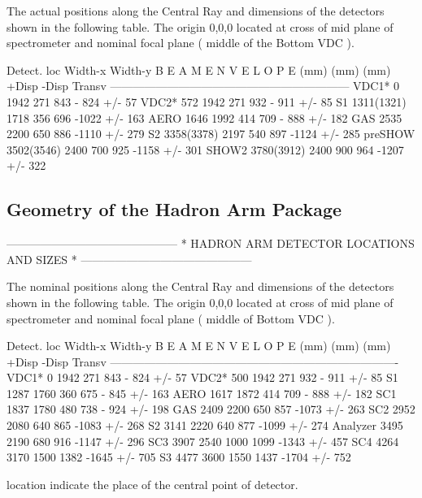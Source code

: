 The actual positions along the Central Ray and dimensions of the detectors shown in 
the following table. The origin 0,0,0 located at cross of mid plane of spectrometer 
and nominal focal plane ( middle of the Bottom VDC ).

Detect.     loc     Width-x  Width-y   B E A M  E N V E L O P E 
            (mm)      (mm)     (mm)    +Disp   -Disp   Transv     
---------------------------------------------------------------  
VDC1*        0        1942     271      843    - 824   +/-  57  
VDC2*       572       1942     271      932    - 911   +/-  85 
S1         1311(1321) 1718     356      696    -1022   +/- 163   
AERO       1646       1992     414      709    - 888   +/- 182   
GAS        2535       2200     650      886    -1110   +/- 279   
S2         3358(3378) 2197     540      897    -1124   +/- 285  
preSHOW    3502(3546) 2400     700      925    -1158   +/- 301   
SHOW2      3780(3912) 2400     900      964    -1207   +/- 322   


\subsection{Geometry of the Hadron Arm Package}
              ---------------------------------------------
              *  HADRON ARM DETECTOR LOCATIONS AND SIZES  *
              ---------------------------------------------

The nominal positions along the Central Ray and dimensions of the detectors shown in 
the following table. The origin 0,0,0 located at cross of mid plane of spectrometer 
and nominal focal plane ( middle of Bottom VDC ).

Detect.     loc     Width-x  Width-y   B E A M  E N V E L O P E 
            (mm)      (mm)     (mm)    +Disp   -Disp   Transv    
----------------------------------------------------------------------------
VDC1*        0        1942     271      843    - 824   +/-  57  
VDC2*       500       1942     271      932    - 911   +/-  85 
S1         1287       1760     360      675    - 845   +/- 163   
AERO       1617       1872     414      709    - 888   +/- 182  
SC1        1837       1780     480      738    - 924   +/- 198   
GAS        2409       2200     650      857    -1073   +/- 263   
SC2        2952       2080     640      865    -1083   +/- 268   
S2         3141       2220     640      877    -1099   +/- 274   
Analyzer   3495       2190     680      916    -1147   +/- 296   
SC3        3907       2540    1000     1099    -1343   +/- 457  
SC4        4264       3170    1500     1382    -1645   +/- 705   
S3         4477       3600    1550     1437    -1704   +/- 752  

location indicate the place of the central point of detector.










